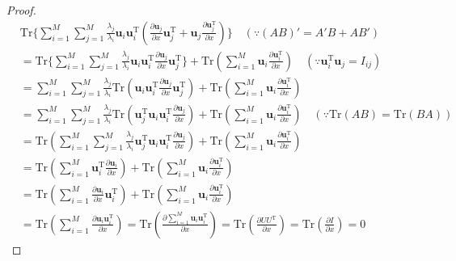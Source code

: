 \begin{proof}
\begin{equation}
\begin{split}
&\text{Tr}\{\sum_{i=1}^{M}\sum_{j=1}^{M}\frac{\lambda_j}{\lambda_i}\mathbf{u}_{i}\mathbf{u}_{i}^{\mathrm{T}}(\frac{\partial{}\mathbf{u}_j}{\partial{}x}\mathbf{u}_{j}^{\mathrm{T}}+\mathbf{u}_{j}\frac{\partial{}\mathbf{u}_{j}^{\mathrm{T}}}{\partial{}x})\}\quad{}(\because{}(AB)'=A'B+AB')\\
&=\text{Tr}\{\sum_{i=1}^{M}\sum_{j=1}^{M}\frac{\lambda_j}{\lambda_i}\mathbf{u}_{i}\mathbf{u}_{i}^{\mathrm{T}}\frac{\partial{}\mathbf{u}_j}{\partial{}x}\mathbf{u}_{j}^{\mathrm{T}}\}+\text{Tr}(\sum_{i=1}^{M}\mathbf{u}_{i}\frac{\partial{}\mathbf{u}_{i}^{\mathrm{T}}}{\partial{}x})\quad{}(\because{}\mathbf{u}_{i}^{\mathrm{T}}\mathbf{u}_{j}=I_{ij})\\
&=\sum_{i=1}^{M}\sum_{j=1}^{M}\frac{\lambda_j}{\lambda_i}\text{Tr}(\mathbf{u}_{i}\mathbf{u}_{i}^{\mathrm{T}}\frac{\partial{}\mathbf{u}_j}{\partial{}x}\mathbf{u}_{j}^{\mathrm{T}})+\text{Tr}(\sum_{i=1}^{M}\mathbf{u}_{i}\frac{\partial{}\mathbf{u}_{i}^{\mathrm{T}}}{\partial{}x})\\
&=\sum_{i=1}^{M}\sum_{j=1}^{M}\frac{\lambda_j}{\lambda_i}\text{Tr}(\mathbf{u}_{j}^{\mathrm{T}}\mathbf{u}_{i}\mathbf{u}_{i}^{\mathrm{T}}\frac{\partial{}\mathbf{u}_j}{\partial{}x})+\text{Tr}(\sum_{i=1}^{M}\mathbf{u}_{i}\frac{\partial{}\mathbf{u}_{i}^{\mathrm{T}}}{\partial{}x})\quad{}(\because{}\text{Tr}(AB)=\text{Tr}(BA))\\
&=\text{Tr}(\sum_{i=1}^{M}\sum_{j=1}^{M}\frac{\lambda_j}{\lambda_i}\mathbf{u}_{j}^{\mathrm{T}}\mathbf{u}_{i}\mathbf{u}_{i}^{\mathrm{T}}\frac{\partial{}\mathbf{u}_j}{\partial{}x})+\text{Tr}(\sum_{i=1}^{M}\mathbf{u}_{i}\frac{\partial{}\mathbf{u}_{i}^{\mathrm{T}}}{\partial{}x})\\
&=\text{Tr}(\sum_{i=1}^{M}\mathbf{u}_{i}^{\mathrm{T}}\frac{\partial{}\mathbf{u}_{i}}{\partial{}x})+\text{Tr}(\sum_{i=1}^{M}\mathbf{u}_{i}\frac{\partial{}\mathbf{u}_{i}^{\mathrm{T}}}{\partial{}x})\\
&=\text{Tr}(\sum_{i=1}^{M}\frac{\partial{}\mathbf{u}_{i}}{\partial{}x}\mathbf{u}_{i}^{\mathrm{T}})+\text{Tr}(\sum_{i=1}^{M}\mathbf{u}_{i}\frac{\partial{}\mathbf{u}_{i}^{\mathrm{T}}}{\partial{}x})\\
&=\text{Tr}(\sum_{i=1}^{M}\frac{\partial{}\mathbf{u}_{i}\mathbf{u}_{i}^{\mathrm{T}}}{\partial{}x})=\text{Tr}(\frac{\partial{}\sum_{i=1}^{M}\mathbf{u}_{i}\mathbf{u}_{i}^{\mathrm{T}}}{\partial{}x})=\text{Tr}(\frac{\partial{}UU^{\mathrm{T}}}{\partial{}x})=\text{Tr}(\frac{\partial{}I}{\partial{}x})=0
\end{split}
\end{equation}
\end{proof}


